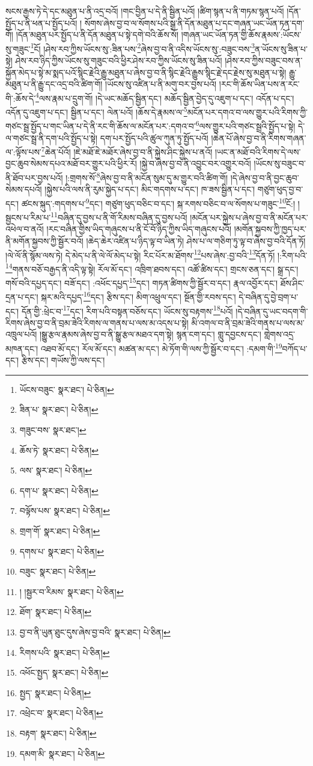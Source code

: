 སངས་རྒྱས་ཏེ་དེ་དང་མཐུན་པ་ནི་འདྲ་བའོ། །གང་བྱིན་པ་དེ་ནི་སྦྱིན་པའོ། །ཚིག་སྙན་པ་ནི་གཏམ་སྙན་པའོ། །དོན་སྤྱོད་པ་ནི་ཕན་པ་སྤྱོད་པའོ། །
སོགས་ཞེས་བྱ་བ་ལ་སོགས་པའི་སྒྲ་ནི་དོན་མཐུན་པ་དང་གཞན་ཡང་ཡོན་ཏན་དག་གོ། །དོན་མཐུན་པར་སྤྱོད་པ་ནི་དོན་མཐུན་པ་སྟེ་དགེ་བའི་ཆོས་སོ། །གཞན་ཡང་ཡོན་ཏན་གྱི་ཆོས་རྣམས་:ཡོངས་སུ་གཟུང་\footnote{ཡོངས་བཟུང་  སྣར་ཐང་།  པེ་ཅིན། }ངོ། །ཤེས་རབ་ཀྱིས་ཡོངས་སུ་:ཟིན་པས་\footnote{ཟིན་པ་  སྣར་ཐང་།  པེ་ཅིན། }ཞེས་བྱ་བ་ནི་འདིས་ཡོངས་སུ་:བཟུང་བས་\footnote{གཟུང་བས་  སྣར་ཐང་། }ན་ཡོངས་སུ་ཟིན་པ་སྟེ། ཤེས་རབ་ཉིད་ཀྱིས་ཡོངས་སུ་གཟུང་བའི་ཕྱིར་ཤེས་རབ་ཀྱིས་ཡོངས་སུ་ཟིན་པའོ། །ཤེས་རབ་ཀྱིས་བཟུང་བས་ན་སྐྱོན་མེད་པ་སྟེ་མ་སྨད་པའོ་སྙིང་རྗེའི་རྒྱུ་མཐུན་པ་ཞེས་བྱ་བ་ནི་སྙིང་རྗེའི་རྒྱུས་སྙིང་རྗེ་དང་རྗེས་སུ་མཐུན་པ་སྟེ། རྒྱུ་མཐུན་པ་ནི་རྒྱུ་དང་འདྲ་བའི་ཚིག་གོ། །ཡོངས་སུ་འཛིན་པ་ནི་མགུ་བར་བྱས་པའོ། །རང་གི་ཆོས་ཡིན་པས་ན་རང་གི་:ཆོས་དེ་\footnote{ཆོས་ཏེ་  སྣར་ཐང་།  པེ་ཅིན། }ལས་རྣམ་པ་དྲུག་གོ། །དེ་ཡང་མཆོད་སྦྱིན་དང་། མཆོད་སྦྱིན་བྱེད་དུ་འཇུག་པ་དང་། འདོན་པ་དང་། འདོན་དུ་འཇུག་པ་དང་། སྦྱིན་པ་དང་། ལེན་པའོ། །ཆོས་དེ་རྣམས་ལ་\footnote{ལས་  སྣར་ཐང་།  པེ་ཅིན། }མངོན་པར་དགའ་བ་ལས་གྱུར་པའི་རིགས་ཀྱི་གཙང་སྦྲ་སྤྱོད་པ་གང་ཡིན་པ་དེ་ནི་རང་གི་ཆོས་ལ་མངོན་པར་:དགའ་བ་\footnote{དག་པ་  སྣར་ཐང་།  པེ་ཅིན། }ལས་གྱུར་པའི་གཙང་སྦྲའི་སྤྱོད་པ་སྟེ། དེ་ལ་གཙང་སྦྲ་ནི་དག་པའི་སྤྱོད་པ་སྟེ། དག་པར་སྤྱོད་པའི་ཚུལ་ཀུན་ཏུ་སྤྱོད་པའོ། །ཆེན་པོ་ཞེས་བྱ་བ་ནི་རིགས་གཞན་ལ་:ལྟོས་པས་\footnote{བལྟོས་པས་  སྣར་ཐང་།  པེ་ཅིན། }ཆེན་པོའོ། །ཇེ་མཐོ་ཇེ་མཐོར་ཞེས་བྱ་བ་ནི་སྐྱེས་ཤིང་སྐྱེས་པ་ནའོ། །ཡང་ན་མཐོ་བའི་རིགས་དེ་ལས་བྱང་ཆུབ་སེམས་དཔའ་མཐོ་བར་གྱུར་པའི་ཕྱིར་རོ། །སྐྱེ་བ་ཞེས་བྱ་བ་ནི་འབྱུང་བར་འགྱུར་བའོ། །ཡོངས་སུ་བཟུང་བ་ནི་ཐོབ་པར་བྱས་པའོ། །:གྲགས་སོ་\footnote{གྲག་གོ་  སྣར་ཐང་།  པེ་ཅིན། }ཞེས་བྱ་བ་ནི་མངོན་སུམ་དུ་མ་གྱུར་བའི་ཚིག་གོ། །དེ་ཞེས་བྱ་བ་ནི་བྱང་ཆུབ་སེམས་དཔའོ། །སྐྱེས་པའི་ལས་ནི་རུམ་སྐྱེད་པ་དང་། མིང་གདགས་པ་དང་། ཁ་ཟས་སྦྱིན་པ་དང་། གཙུག་ཕུད་བྱ་བ་དང་། ཚངས་སྐུད་:གདགས་པ་\footnote{དགས་པ་  སྣར་ཐང་།  པེ་ཅིན། }དང་། གཙུག་ཕུད་བཅིང་བ་དང་། སྐ་རགས་བཅིང་བ་ལ་སོགས་པ་གཟུང་\footnote{བཟུང་  སྣར་ཐང་།  པེ་ཅིན། }ངོ:། །སྦྱངས་པ་རིམ་པ་\footnote{། །སྦྱར་བ་རིམས་  སྣར་ཐང་།  པེ་ཅིན། }བཞིན་དུ་བྱས་པ་ནི་གོ་རིམས་བཞིན་དུ་བྱས་པའོ། །མངོན་པར་སྐྱེས་པ་ཞེས་བྱ་བ་ནི་མངོན་པར་འཕེལ་བ་ནའོ། །རང་བཞིན་གྱིས་ཡིད་གཞུངས་པ་ནི་ངོ་བོ་ཉིད་ཀྱིས་ཡིད་གཞུངས་པའོ། །མགོན་སྐྱབས་ཀྱི་ཁྱད་པར་ནི་མགོན་སྐྱབས་ཀྱི་སྦྱོར་བའོ། །ཆེད་ཆེར་འཛིན་པ་ཉིད་ལྟ་བ་ཡིན་ཏེ། ཤེས་པ་ལ་གཅིག་ཏུ་ལྟ་བ་ཞེས་བྱ་བའི་དོན་ཏོ། །ལེ་ལོ་ནི་སྙོམ་ལས་ཏེ། དེ་མེད་པ་ནི་ལེ་ལོ་མེད་པ་སྟེ། རིང་པོར་མ་ཐོགས་\footnote{ཐོག་  སྣར་ཐང་།  པེ་ཅིན། }པས་ཞེས་:བྱ་བའི་\footnote{བྱ་བ་ནི་ཡུན་ཐུང་དུས་ཞེས་བྱ་བའི་  སྣར་ཐང་།  པེ་ཅིན། }དོན་ཏོ། །:རིག་པའི་\footnote{རིགས་པའི་  སྣར་ཐང་།  པེ་ཅིན། }གནས་བཅོ་བརྒྱད་ནི་འདི་ལྟ་སྟེ། རོལ་མོ་དང་། འཁྲིག་ཐབས་དང་། འཚོ་ཚིས་དང་། གྲངས་ཅན་དང་། སྒྲ་དང་། གསོ་བའི་དཔྱད་དང་། བཟོ་དང་། :འཕོང་དཔྱད་\footnote{འཕོང་སྤྱད་  སྣར་ཐང་།  པེ་ཅིན། }དང་། གཏན་ཚིགས་ཀྱི་སྦྱོར་བ་དང་། རྣལ་འབྱོར་དང་། ཐོས་ཤིང་དྲན་པ་དང་། སྐར་མའི་དཔྱད་\footnote{སྤྱད་  སྣར་ཐང་།  པེ་ཅིན། }དང་། རྩིས་དང་། མིག་འཕྲུལ་དང་། སྔོན་གྱི་རབས་དང་། དེ་བཞིན་དུ་བྱེ་བྲག་པ་དང་། དོན་གྱི་:ཕྲེང་བ་\footnote{འཕྲེང་བ་  སྣར་ཐང་།  པེ་ཅིན། }དང་། རིག་པའི་བསྟན་བཅོས་དང་། ཡོངས་སུ་བརྟགས་\footnote{བརྟག་  སྣར་ཐང་།  པེ་ཅིན། }པའོ། །དེ་བཞིན་དུ་ཡང་བདག་གི་རིགས་ཞེས་བྱ་བ་ནི་བྲམ་ཟེའི་རིགས་ལ་གནས་པ་ལས་མ་འདས་པ་སྟེ། མི་འགལ་བ་ནི་བྲམ་ཟེའི་གནས་པ་ལས་མ་འཁྲུལ་པའོ། །སྒྱུ་རྩལ་རྣམས་ཞེས་བྱ་བ་ནི་སྒྱུ་རྩལ་མཐའ་དག་སྟེ། སྙན་ངག་དང་། གླུ་དབྱངས་དང་། གླེགས་འདྲ་མཁན་དང་། འཐབ་མོ་དང་། རོལ་མོ་དང་། མཚན་མ་དང་། མེ་ཏོག་གི་ལས་ཀྱི་སྦྱོར་བ་དང་། :དམག་གི་\footnote{དམག་མི་  སྣར་ཐང་།  པེ་ཅིན། }བཀོད་པ་དང་། རྩིས་དང་། གཡོས་ཀྱི་ལས་དང་། 